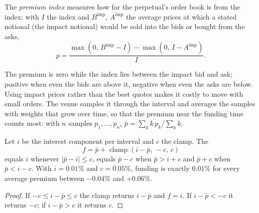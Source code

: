 \begin{definition}\label{def:m3:perpetual-futures:premium}
The \emph{premium index} measures how far the perpetual's order book is from the index:
with $I$ the index and $B^{\mathrm{imp}}$, $A^{\mathrm{imp}}$ the average prices at which a stated notional
(the impact notional) would be sold into the bids or bought from the asks,
\[
p = \frac{\max(0,\, B^{\mathrm{imp}} - I) - \max(0,\, I - A^{\mathrm{imp}})}{I}.
\]
\end{definition}

The premium is zero while the index lies between the impact bid and ask; positive when even the bids are above
it, negative when even the asks are below. Using impact prices rather than the best quotes makes it costly to
move with small orders. The venue samples it through the interval and averages the samples with weights that
grow over time, so that the premium near the funding time counts most: with $n$ samples $p_1,\dots,p_n$,
$\bar p = \sum_k k\,p_k \big/ \sum_k k$.

\begin{proposition}\label{prop:m3:perpetual-futures:rule}
Let $i$ be the interest component per interval and $c$ the clamp. The 
\[
f = \bar p + \operatorname{clamp}(i - \bar p,\, -c,\, c)
\]
equals $i$ whenever $|\bar p - i| \le c$, equals $\bar p - c$ when $\bar p > i + c$ and $\bar p + c$ when
$\bar p < i - c$. With $i = 0.01\%$ and $c = 0.05\%$, funding is exactly $0.01\%$ for every average premium
between $-0.04\%$ and $+0.06\%$.
\end{proposition}

\begin{proof}
If $-c \le i - \bar p \le c$ the clamp returns $i - \bar p$ and $f = i$. If $i - \bar p < -c$ it returns $-c$;
if $i - \bar p > c$ it returns $c$.
\end{proof}

